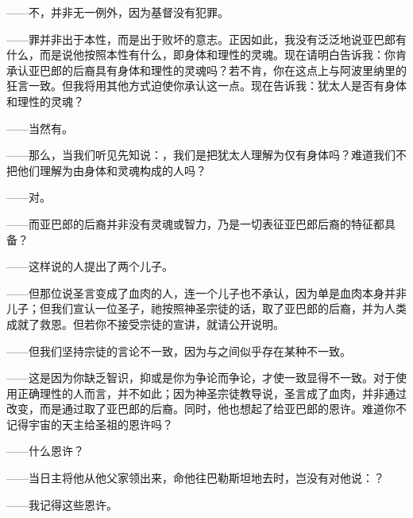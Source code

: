 ——不，并非无一例外，因为基督没有犯罪。\par

——罪并非出于本性，而是出于败坏的意志。正因如此，我没有泛泛地说亚巴郎有什么，而是说他按照本性有什么，即身体和理性的灵魂。现在请明白告诉我：你肯承认亚巴郎的后裔具有身体和理性的灵魂吗？若不肯，你在这点上与阿波里纳里的狂言一致。但我将用其他方式迫使你承认这一点。现在告诉我：犹太人是否有身体和理性的灵魂？\par

——当然有。\par

——那么，当我们听见先知说：，我们是把犹太人理解为仅有身体吗？难道我们不把他们理解为由身体和灵魂构成的人吗？\par

——对。\par

——而亚巴郎的后裔并非没有灵魂或智力，乃是一切表征亚巴郎后裔的特征都具备？\par

——这样说的人提出了两个儿子。\par

——但那位说圣言变成了血肉的人，连一个儿子也不承认，因为单是血肉本身并非儿子；但我们宣认一位圣子，祂按照神圣宗徒的话，取了亚巴郎的后裔，并为人类成就了救恩。但若你不接受宗徒的宣讲，就请公开说明。\par

——但我们坚持宗徒的言论不一致，因为与之间似乎存在某种不一致。\par

——这是因为你缺乏智识，抑或是你为争论而争论，才使一致显得不一致。对于使用正确理性的人而言，并不如此；因为神圣宗徒教导说，圣言成了血肉，并非通过改变，而是通过取了亚巴郎的后裔。同时，他也想起了给亚巴郎的恩许。难道你不记得宇宙的天主给圣祖的恩许吗？\par

——什么恩许？\par

——当日主将他从他父家领出来，命他往巴勒斯坦地去时，岂没有对他说：？\par

——我记得这些恩许。\par

